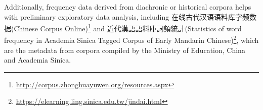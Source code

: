 Additionally, frequency data derived from diachronic or historical corpora helps with preliminary exploratory data analysis, including 在线古代汉语语料库字频数据(Chinese Corpus Online)\footnote{\url{http://corpus.zhonghuayuwen.org/resources.aspx}} and 近代漢語語料庫詞頻統計(Statistics of word frequency in Academia Sinica Tagged Corpus of Early Mandarin Chinese)\footnote{\url{https://elearning.ling.sinica.edu.tw/jindai.html}}, which are the metadata from corpora compiled by the Ministry of Education, China and Academia Sinica.




